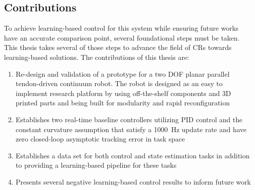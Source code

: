 \subsection{Contributions}
To achieve learning-based control for this system while ensuring future works have an accurate comparison point, several foundational steps must be taken. This thesis takes several of those steps to advance the field of CRs towards learning-based solutions. The contributions of this thesis are:
\begin{enumerate}
    \item Re-design and validation of a prototype for a two DOF planar parallel tendon-driven continuum robot. The robot is designed as an easy to implement research platform by using off-the-shelf components and 3D printed parts and being built for modularity and rapid reconfiguration  
    \item Establishes two real-time baseline controllers utilizing PID control and the constant curvature assumption that satisfy a \SI{1000}{Hz} update rate and have zero closed-loop asymptotic tracking error in task space  
    \item Establishes a data set for both control and state estimation tasks in addition to providing a learning-based pipeline for these tasks
    \item Presents several negative learning-based control results to inform future work 
\end{enumerate}




